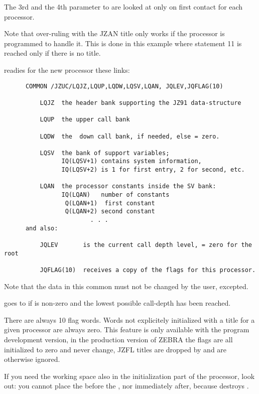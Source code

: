 The 3rd and the 4th parameter to  are looked at only on first
contact for each processor.

Note that over-ruling with the JZAN title only works
if the processor is programmed to handle it.
This is done in this example where statement 11
is reached only if there is no title.

 readies for the new processor these links:

\begin{verbatim}
      COMMON /JZUC/LQJZ,LQUP,LQDW,LQSV,LQAN, JQLEV,JQFLAG(10)

          LQJZ  the header bank supporting the JZ91 data-structure

          LQUP  the upper call bank

          LQDW  the  down call bank, if needed, else = zero.

          LQSV  the bank of support variables;
                IQ(LQSV+1) contains system information,
                IQ(LQSV+2) is 1 for first entry, 2 for second, etc.

          LQAN  the processor constants inside the SV bank:
                IQ(LQAN)   number of constants
                 Q(LQAN+1)  first constant
                 Q(LQAN+2) second constant
                        . . .
      and also:

          JQLEV       is the current call depth level, = zero for the root

          JQFLAG(10)  receives a copy of the flags for this processor.
\end{verbatim} 

Note that the data in this common  must not be changed
by the user,  excepted.

 goes to  if  is non-zero and
the lowest possible call-depth has been reached.

There are always 10 flag words.
Words not explicitely initialized with a  title
for a given processor are always zero.
This feature is only available with the program development version,
in the production version of ZEBRA the flags are
all initialized to zero and never change,
JZFL titles are dropped by  and are otherwise ignored.

If you need the working space also in the initialization
part of the processor, look out:
you cannot place the  before the
,
nor immediately after, because  destroys .

